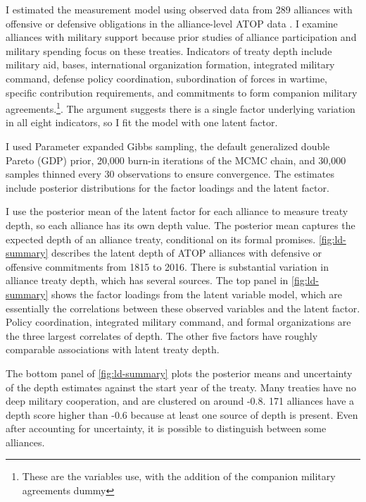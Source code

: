 \documentclass[12pt]{article}
\begin{document}
I estimated the measurement model using observed data from 289 alliances with offensive or defensive obligations in the alliance-level ATOP data \citep{Leedsetal2002}. 
I examine alliances with military support because prior studies of alliance participation and military spending focus on these treaties.
Indicators of treaty depth include military aid, bases, international organization formation, integrated military command, defense policy coordination, subordination of forces in wartime, specific contribution requirements, and commitments to form companion military agreements.\footnote{These are the variables \citet{LeedsAnac2005} use, with the addition of the companion military agreements dummy}. 
The argument suggests there is a single factor underlying variation in all eight indicators, so I fit the model with one latent factor. 


I used Parameter expanded Gibbs sampling, the default generalized double Pareto (GDP) prior, 20,000 burn-in iterations of the MCMC chain, and 30,000 samples thinned every 30 observations to ensure convergence. 
The estimates include posterior distributions for the factor loadings and the latent factor. 


I use the posterior mean of the latent factor for each alliance to measure treaty depth, so each alliance has its own depth value.
The posterior mean captures the expected depth of an alliance treaty, conditional on its formal promises. 
\autoref{fig:ld-summary} describes the latent depth of ATOP alliances with defensive or offensive commitments from 1815 to 2016.
There is substantial variation in alliance treaty depth, which has several sources. 
The top panel in \autoref{fig:ld-summary} shows the factor loadings from the latent variable model, which are essentially the correlations between these observed variables and the latent factor. 
Policy coordination, integrated military command, and formal organizations are the three largest correlates of depth. 
The other five factors have roughly comparable associations with latent treaty depth. 


The bottom panel of \autoref{fig:ld-summary} plots the posterior means and uncertainty of the depth estimates against the start year of the treaty. 
Many treaties have no deep military cooperation, and are clustered on around -0.8.  
171 alliances have a depth score higher than -0.6 because at least one source of depth is present. 
Even after accounting for uncertainty, it is possible to distinguish between some alliances. 
\end{document}
